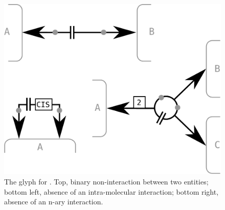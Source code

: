 \begin{figure}[H]
  \centering
  \includegraphics[scale = 0.3]{images/non-interaction}
  \caption{The \ER glyph for . Top, binary non-interaction between two entities; bottom left, absence of an intra-molecular interaction; bottom right, absence of an n-ary interaction.}
  \label{fig:non-interaction}
\end{figure}

\normalcolor